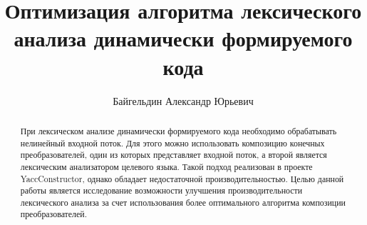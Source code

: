 \title{Оптимизация алгоритма лексического анализа динамически формируемого кода}


\author{Байгельдин Александр Юрьевич}



\maketitle             

\begin{abstract}
При лексическом анализе динамически формируемого кода необходимо обрабатывать нелинейный входной поток.
Для этого  можно использовать композицию конечных преобразователей,
один из которых представляет входной поток, а второй является лексическим анализатором целевого языка.
Такой подход реализован в проекте YaccConstructor, однако обладает недостаточной производительностью. 
Целью данной работы является исследование возможности улучшения производительности лексического анализа 
за счет использования более оптимального алгоритма композиции преобразователей.
\end{abstract}







